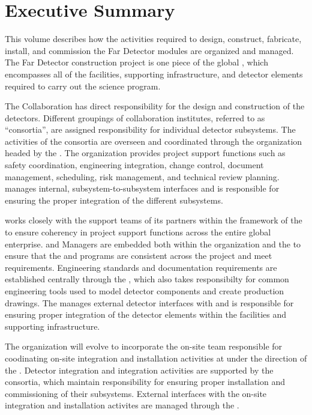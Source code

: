 \chapter{Executive Summary}
\label{vl:tc-execsum}

This volume describes how the activities required to design, construct,
fabricate, install, and commission the  Far Detector modules
are organized and managed.  The  Far Detector construction
project is one piece of the global , which encompasses
all of the facilities, supporting infrastructure, and detector elements
required to carry out the  science program.

The  Collaboration has direct responsibility for the design
and construction of the  detectors.  Different groupings
of collaboration institutes, referred to as ``consortia'', are assigned
responsibility for individual detector subsystems.  The activities
of the consortia are overseen and coordinated through the 
 organization headed by the  . 
The  organization provides project support functions such as
safety coordination, engineering integration, change control, document
management, scheduling, risk management, and technical review planning.
  manages internal, subsystem-to-subsystem
interfaces and is responsible for ensuring the proper integration of
the different subsystems.

  works closely with the support teams of its
 partners within the framework of the  to
ensure coherency in project support functions across the entire global
enterprise.    and  Managers are
embedded both within the   organization and the
 to ensure that the   and 
programs are consistent across the project and meet 
requirements.  Engineering standards and documentation requirements
are established centrally through the , which also takes
responsibilty for common engineering tools used to model detector
components and create production drawings.  The  manages
external  detector interfaces with  and is
responsible for ensuring proper integration of the detector elements
within the facilities and supporting infrastructure.

The  organization will evolve to incorporate the on-site
team responsible for coodinating on-site integration and installation
activities at  under the direction of the .
Detector integration and integration activities are supported by the
 consortia, which maintain responsibility for ensuring
proper installation and commissioning of their subsystems.  External
 interfaces with the on-site integration and installation
activites are managed through the .

